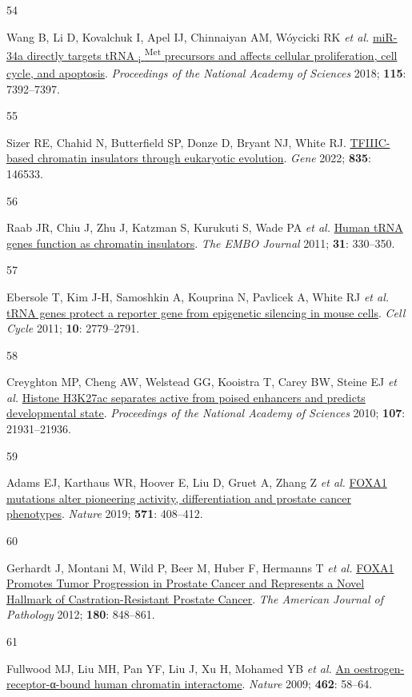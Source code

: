 \documentclass[
  12pt,
]{article}
\newlength{\cslhangindent}
\newlength{\csllabelwidth}
\newlength{\cslentryspacingunit} %
\newenvironment{CSLReferences}[2] %
 {%
  \setlength{\parindent}{0pt}
  \ifodd #1
  \let\oldpar\par
  \def\par{\hangindent=\cslhangindent\oldpar}
  \fi
  \setlength{\parskip}{#2\cslentryspacingunit}
 }%
 {}
\newcommand{\CSLLeftMargin}[1]{\parbox[t]{\csllabelwidth}{#1}}
\newcommand{\CSLRightInline}[1]{\parbox[t]{\linewidth - \csllabelwidth}{#1}\break}
\begin{document}
\begin{CSLReferences}{0}{0}
\leavevmode{}%
\CSLLeftMargin{54 }%
\CSLRightInline{Wang B, Li D, Kovalchuk I, Apel IJ, Chinnaiyan AM, Wóycicki RK \emph{et al.} \href{https://doi.org/10.1073/pnas.1703029115}{miR-34a directly targets tRNA {\textsubscript{i}} {\textsuperscript{Met}} precursors and affects cellular proliferation, cell cycle, and apoptosis}. \emph{Proceedings of the National Academy of Sciences} 2018; \textbf{115}: 7392--7397.}

\leavevmode{}%
\CSLLeftMargin{55 }%
\CSLRightInline{Sizer RE, Chahid N, Butterfield SP, Donze D, Bryant NJ, White RJ. \href{https://doi.org/10.1016/j.gene.2022.146533}{TFIIIC-based chromatin insulators through eukaryotic evolution}. \emph{Gene} 2022; \textbf{835}: 146533.}

\leavevmode{}%
\CSLLeftMargin{56 }%
\CSLRightInline{Raab JR, Chiu J, Zhu J, Katzman S, Kurukuti S, Wade PA \emph{et al.} \href{https://doi.org/10.1038/emboj.2011.406}{Human tRNA genes function as chromatin insulators}. \emph{The EMBO Journal} 2011; \textbf{31}: 330--350.}

\leavevmode{}%
\CSLLeftMargin{57 }%
\CSLRightInline{Ebersole T, Kim J-H, Samoshkin A, Kouprina N, Pavlicek A, White RJ \emph{et al.} \href{https://doi.org/10.4161/cc.10.16.17092}{tRNA genes protect a reporter gene from epigenetic silencing in mouse cells}. \emph{Cell Cycle} 2011; \textbf{10}: 2779--2791.}

\leavevmode{}%
\CSLLeftMargin{58 }%
\CSLRightInline{Creyghton MP, Cheng AW, Welstead GG, Kooistra T, Carey BW, Steine EJ \emph{et al.} \href{https://doi.org/10.1073/pnas.1016071107}{Histone H3K27ac separates active from poised enhancers and predicts developmental state}. \emph{Proceedings of the National Academy of Sciences} 2010; \textbf{107}: 21931--21936.}

\leavevmode{}%
\CSLLeftMargin{59 }%
\CSLRightInline{Adams EJ, Karthaus WR, Hoover E, Liu D, Gruet A, Zhang Z \emph{et al.} \href{https://doi.org/10.1038/s41586-019-1318-9}{FOXA1 mutations alter pioneering activity, differentiation and prostate cancer phenotypes}. \emph{Nature} 2019; \textbf{571}: 408--412.}

\leavevmode{}%
\CSLLeftMargin{60 }%
\CSLRightInline{Gerhardt J, Montani M, Wild P, Beer M, Huber F, Hermanns T \emph{et al.} \href{https://doi.org/10.1016/j.ajpath.2011.10.021}{FOXA1 Promotes Tumor Progression in Prostate Cancer and Represents a Novel Hallmark of Castration-Resistant Prostate Cancer}. \emph{The American Journal of Pathology} 2012; \textbf{180}: 848--861.}

\leavevmode{}%
\CSLLeftMargin{61 }%
\CSLRightInline{Fullwood MJ, Liu MH, Pan YF, Liu J, Xu H, Mohamed YB \emph{et al.} \href{https://doi.org/10.1038/nature08497}{An oestrogen-receptor-α-bound human chromatin interactome}. \emph{Nature} 2009; \textbf{462}: 58--64.}

\end{CSLReferences}
\end{document}
